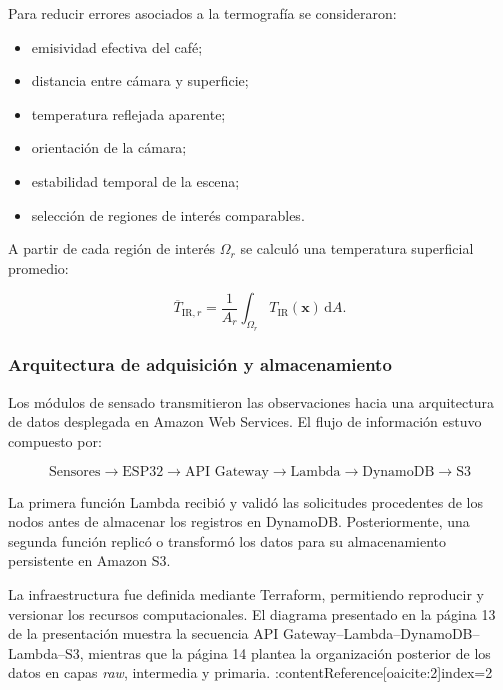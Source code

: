 Para reducir errores asociados a la termografía se consideraron:

\begin{itemize}
    \item emisividad efectiva del café;
    \item distancia entre cámara y superficie;
    \item temperatura reflejada aparente;
    \item orientación de la cámara;
    \item estabilidad temporal de la escena;
    \item selección de regiones de interés comparables.
\end{itemize}

A partir de cada región de interés $\Omega_r$ se calculó una temperatura superficial promedio:

\begin{equation}
\overline{T}_{\mathrm{IR},r}
=
\frac{1}{A_r}
\int_{\Omega_r}
T_{\mathrm{IR}}(\mathbf{x})\,\mathrm{d}A.
\label{eq:temperatura_termografica_promedio}
\end{equation}

\subsubsection{Arquitectura de adquisición y almacenamiento}
\label{subsubsec:arquitectura_datos}

Los módulos de sensado transmitieron las observaciones hacia una arquitectura de datos desplegada en Amazon Web Services. El flujo de información estuvo compuesto por:

\begin{equation}
\boxed{
\text{Sensores}
\rightarrow
\text{ESP32}
\rightarrow
\text{API Gateway}
\rightarrow
\text{Lambda}
\rightarrow
\text{DynamoDB}
\rightarrow
\text{S3}
}
\end{equation}

La primera función Lambda recibió y validó las solicitudes procedentes de los nodos antes de almacenar los registros en DynamoDB. Posteriormente, una segunda función replicó o transformó los datos para su almacenamiento persistente en Amazon S3.

La infraestructura fue definida mediante Terraform, permitiendo reproducir y versionar los recursos computacionales. El diagrama presentado en la página 13 de la presentación muestra la secuencia API Gateway--Lambda--DynamoDB--Lambda--S3, mientras que la página 14 plantea la organización posterior de los datos en capas \textit{raw}, intermedia y primaria. :contentReference[oaicite:2]{index=2}

